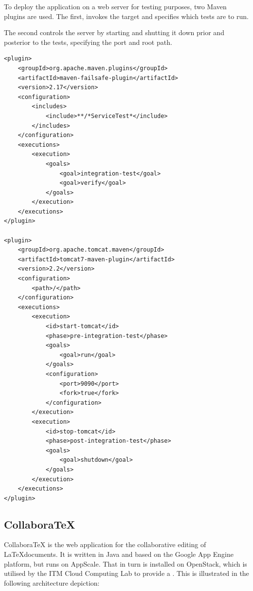 To deploy the application on a web server for testing purposes, two Maven plugins are used. The first,  invokes the target  and specifies which tests are to run.

The second controls the server by starting and shutting it down prior and posterior to the tests, specifying the port and root path. 

\pagebreak

\begin{lstlisting}[caption=Integration Tests Configuration in CompiLaTex]
<plugin>
    <groupId>org.apache.maven.plugins</groupId>
    <artifactId>maven-failsafe-plugin</artifactId>
    <version>2.17</version>
    <configuration>
        <includes>
            <include>**/*ServiceTest*</include>
        </includes>
    </configuration>
    <executions>
        <execution>
            <goals>
                <goal>integration-test</goal>
                <goal>verify</goal>
            </goals>
        </execution>
    </executions>
</plugin>

<plugin>
    <groupId>org.apache.tomcat.maven</groupId>
    <artifactId>tomcat7-maven-plugin</artifactId>
    <version>2.2</version>
    <configuration>
        <path>/</path>
    </configuration>
    <executions>
        <execution>
            <id>start-tomcat</id>
            <phase>pre-integration-test</phase>
            <goals>
                <goal>run</goal>
            </goals>
            <configuration>
                <port>9090</port>
                <fork>true</fork>
            </configuration>
        </execution>
        <execution>
            <id>stop-tomcat</id>
            <phase>post-integration-test</phase>
            <goals>
                <goal>shutdown</goal>
            </goals>
        </execution>
    </executions>
</plugin>
\end{lstlisting}

\subsection{CollaboraTeX}
\label{subsec:collaboratex}
CollaboraTeX is the web application for the collaborative editing of \LaTeX documents. It is written in Java and based on the Google App Engine platform, but runs on AppScale. That in turn is installed on OpenStack, which is utilised by the ITM Cloud Computing Lab to provide a . This is illustrated in the following architecture depiction:

